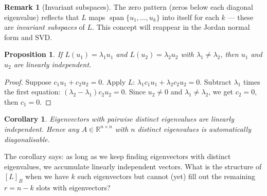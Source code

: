 \documentclass[11pt]{article}
\theoremstyle{definition}
\newtheorem{remark}{Remark}[section]
\theoremstyle{plain}
\newtheorem{proposition}{Proposition}[section]
\newtheorem{corollary}{Corollary}[section]
\begin{document}
\begin{remark}[Invariant subspaces]
  The zero pattern (zeros below each diagonal eigenvalue) reflects that
  $L$ maps $\operatorname{span}\{u_1,\ldots,u_k\}$ into itself for each $k$
  --- these are \emph{invariant subspaces} of $L$.  This concept will
  reappear in the Jordan normal form and SVD.
\end{remark}

\begin{proposition}
  If $L(u_1) = \lambda_1 u_1$ and $L(u_2) = \lambda_2 u_2$ with
  $\lambda_1 \neq \lambda_2$, then $u_1$ and $u_2$ are linearly independent.
\end{proposition}
\begin{proof}
  Suppose $c_1 u_1 + c_2 u_2 = 0$.  Apply $L$:
  $\lambda_1 c_1 u_1 + \lambda_2 c_2 u_2 = 0$.
  Subtract $\lambda_1$ times the first equation:
  $(\lambda_2 - \lambda_1)c_2 u_2 = 0$.
  Since $u_2 \neq 0$ and $\lambda_1 \neq \lambda_2$, we get $c_2 = 0$,
  then $c_1 = 0$.
\end{proof}

\begin{corollary}
  Eigenvectors with pairwise distinct eigenvalues are linearly independent.
  Hence any $A \in \mathbb{R}^{n\times n}$ with $n$ distinct eigenvalues
  is automatically diagonalisable.
\end{corollary}

\medskip\noindent
The corollary says: as long as we keep finding eigenvectors with distinct
eigenvalues, we accumulate linearly independent vectors.  What is the
structure of $[L]_B$ when we have $k$ such eigenvectors but cannot (yet)
fill out the remaining $r = n - k$ slots with eigenvectors?
\end{document}
